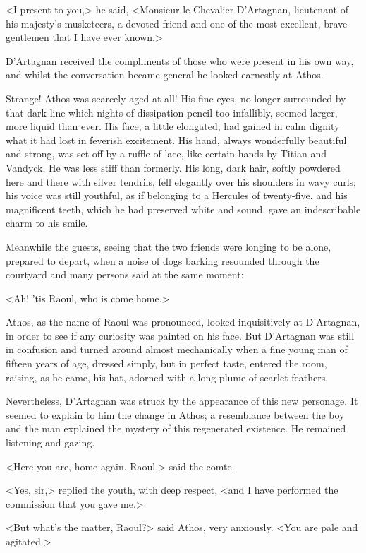 <I present to you,> he said, <Monsieur le Chevalier D'Artagnan, lieutenant of his majesty's musketeers, a devoted friend and one of the most excellent, brave gentlemen that I have ever known.>

D'Artagnan received the compliments of those who were present in his own way, and whilst the conversation became general he looked earnestly at Athos.

Strange! Athos was scarcely aged at all! His fine eyes, no longer surrounded by that dark line which nights of dissipation pencil too infallibly, seemed larger, more liquid than ever. His face, a little elongated, had gained in calm dignity what it had lost in feverish excitement. His hand, always wonderfully beautiful and strong, was set off by a ruffle of lace, like certain hands by Titian and Vandyck. He was less stiff than formerly. His long, dark hair, softly powdered here and there with silver tendrils, fell elegantly over his shoulders in wavy curls; his voice was still youthful, as if belonging to a Hercules of twenty-five, and his magnificent teeth, which he had preserved white and sound, gave an indescribable charm to his smile.

Meanwhile the guests, seeing that the two friends were longing to be alone, prepared to depart, when a noise of dogs barking resounded through the courtyard and many persons said at the same moment:

<Ah! 'tis Raoul, who is come home.>

Athos, as the name of Raoul was pronounced, looked inquisitively at D'Artagnan, in order to see if any curiosity was painted on his face. But D'Artagnan was still in confusion and turned around almost mechanically when a fine young man of fifteen years of age, dressed simply, but in perfect taste, entered the room, raising, as he came, his hat, adorned with a long plume of scarlet feathers.

Nevertheless, D'Artagnan was struck by the appearance of this new personage. It seemed to explain to him the change in Athos; a resemblance between the boy and the man explained the mystery of this regenerated existence. He remained listening and gazing.

<Here you are, home again, Raoul,> said the comte.

<Yes, sir,> replied the youth, with deep respect, <and I have performed the commission that you gave me.>

<But what's the matter, Raoul?> said Athos, very anxiously. <You are pale and agitated.>

